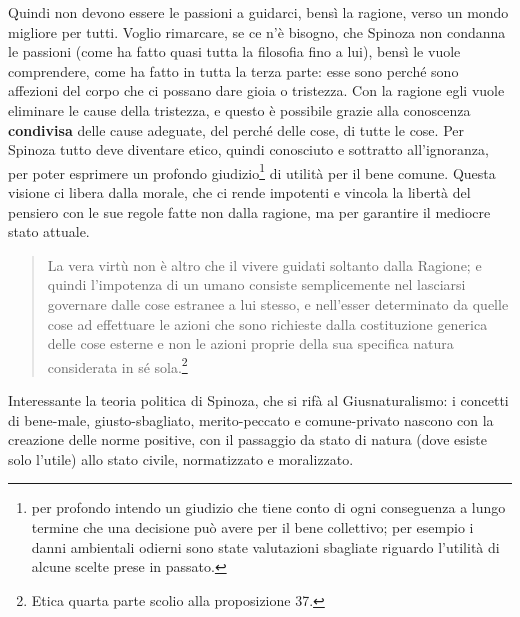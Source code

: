 Quindi non devono essere le passioni a guidarci, bensì la ragione, verso un mondo migliore per tutti. Voglio rimarcare, se ce n'è bisogno, che Spinoza non condanna le passioni (come ha fatto quasi tutta la filosofia fino a lui), bensì le vuole comprendere, come ha fatto in tutta la terza parte: esse sono  perché sono affezioni del corpo che ci possano dare gioia o tristezza. Con la ragione egli vuole eliminare le cause della tristezza, e questo è possibile grazie alla conoscenza \textbf{condivisa} delle cause adeguate, del perché delle cose, di tutte le cose. Per Spinoza tutto deve diventare etico, quindi conosciuto e sottratto all'ignoranza, per poter esprimere un profondo giudizio\footnote{per profondo intendo un giudizio che tiene conto di ogni conseguenza a lungo termine che una decisione può avere per il bene collettivo; per esempio i danni ambientali odierni sono state valutazioni sbagliate riguardo l'utilità di alcune scelte prese in passato.} di utilità per il bene comune. Questa visione ci libera dalla morale, che  ci rende impotenti e vincola la libertà del pensiero con le sue regole fatte non dalla ragione, ma per garantire il mediocre stato attuale.

\begin{quotation}
	\small La vera virtù non è altro che il vivere guidati soltanto dalla Ragione; e quindi l’impotenza di
	un umano consiste semplicemente nel lasciarsi governare dalle cose estranee a lui stesso, e
	nell’esser determinato da quelle cose ad effettuare le azioni che sono richieste dalla costituzione generica delle cose esterne e non le azioni proprie della sua specifica natura considerata in sé sola.\footnote{Etica quarta parte scolio alla proposizione 37.}
\end{quotation}

Interessante la teoria politica di Spinoza, che si rifà al Giusnaturalismo: i concetti di bene-male, giusto-sbagliato, merito-peccato e comune-privato nascono con la creazione delle norme positive, con il passaggio da stato di natura (dove esiste solo l'utile) allo stato civile, normatizzato e moralizzato.

